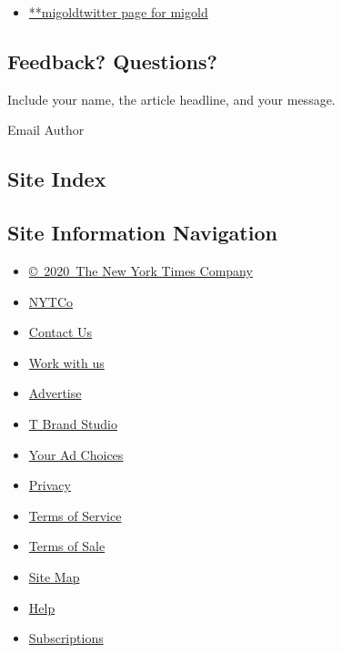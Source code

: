 \begin{itemize}
\tightlist
\item
  \href{https://twitter.com/migold}{**migoldtwitter page for migold}
\end{itemize}

\hypertarget{feedback-questions}{%
\subsection{Feedback? Questions?}\label{feedback-questions}}

Include your name, the article headline, and your message.

Email Author

\hypertarget{site-index}{%
\subsection{Site Index}\label{site-index}}

\hypertarget{site-information-navigation}{%
\subsection{Site Information
Navigation}\label{site-information-navigation}}

\begin{itemize}
\tightlist
\item
  \href{https://help.nytimes3xbfgragh.onion/hc/en-us/articles/115014792127-Copyright-notice}{©~2020~The
  New York Times Company}
\end{itemize}

\begin{itemize}
\tightlist
\item
  \href{https://www.nytco.com/}{NYTCo}
\item
  \href{https://help.nytimes3xbfgragh.onion/hc/en-us/articles/115015385887-Contact-Us}{Contact
  Us}
\item
  \href{https://www.nytco.com/careers/}{Work with us}
\item
  \href{https://nytmediakit.com/}{Advertise}
\item
  \href{http://www.tbrandstudio.com/}{T Brand Studio}
\item
  \href{https://www.nytimes3xbfgragh.onion/privacy/cookie-policy\#how-do-i-manage-trackers}{Your
  Ad Choices}
\item
  \href{https://www.nytimes3xbfgragh.onion/privacy}{Privacy}
\item
  \href{https://help.nytimes3xbfgragh.onion/hc/en-us/articles/115014893428-Terms-of-service}{Terms
  of Service}
\item
  \href{https://help.nytimes3xbfgragh.onion/hc/en-us/articles/115014893968-Terms-of-sale}{Terms
  of Sale}
\item
  \href{https://spiderbites.nytimes3xbfgragh.onion}{Site Map}
\item
  \href{https://help.nytimes3xbfgragh.onion/hc/en-us}{Help}
\item
  \href{https://www.nytimes3xbfgragh.onion/subscription?campaignId=37WXW}{Subscriptions}
\end{itemize}

